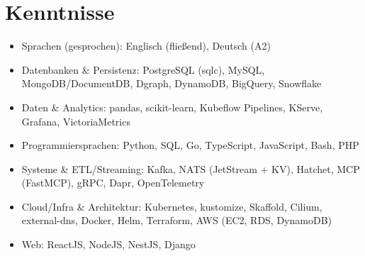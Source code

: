 \documentclass[10pt,a4paper]{resume}
\begin{document}
\section{Kenntnisse}

\begin{itemize}[leftmargin=1.4em,nosep,topsep=2pt]
  \item Sprachen (gesprochen): Englisch (fließend), Deutsch (A2)
  \item Datenbanken \& Persistenz: PostgreSQL (sqlc), MySQL, MongoDB/DocumentDB, Dgraph, DynamoDB, BigQuery, Snowflake
  \item Daten \& Analytics: pandas, scikit-learn, Kubeflow Pipelines, KServe, Grafana, VictoriaMetrics
  \item Programmiersprachen: Python, SQL, Go, TypeScript, JavaScript, Bash, PHP
  \item Systeme \& ETL/Streaming: Kafka, NATS (JetStream + KV), Hatchet, MCP (FastMCP), gRPC, Dapr, OpenTelemetry
  \item Cloud/Infra \& Architektur: Kubernetes, kustomize, Skaffold, Cilium, external-dns, Docker, Helm, Terraform, AWS (EC2, RDS, DynamoDB)
  \item Web: ReactJS, NodeJS, NestJS, Django
\end{itemize}
\end{document}
